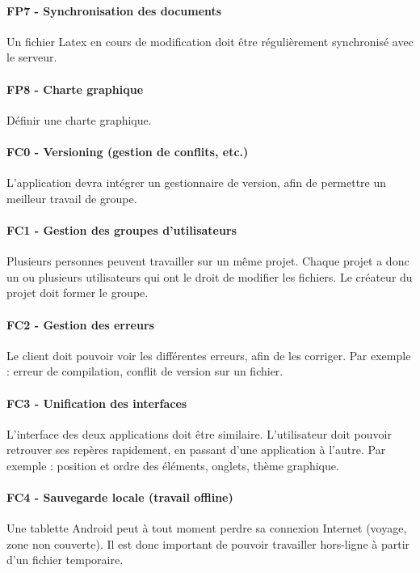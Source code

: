 \documentclass[a4paper,12pt]{article}
\begin{document}
\paragraph{FP7 - Synchronisation des documents\\}
Un fichier Latex en cours de modification doit être régulièrement synchronisé avec le serveur.

\paragraph{FP8 - Charte graphique\\}
Définir une charte graphique.


\paragraph{FC0 - Versioning (gestion de conflits, etc.)\\}
L'application devra intégrer un gestionnaire de version, afin de permettre un meilleur travail de
groupe.

\paragraph{FC1 - Gestion des groupes d'utilisateurs\\}
Plusieurs personnes peuvent travailler sur un même projet. Chaque projet a donc un ou plusieurs 
utilisateurs qui ont le droit de modifier les fichiers. Le créateur du projet doit former le groupe.

\paragraph{FC2 - Gestion des erreurs\\}
Le client doit pouvoir voir les différentes erreurs, afin de les corriger. Par exemple : erreur 
de compilation, conflit de version sur un fichier.

\paragraph{FC3 - Unification des interfaces\\}
L'interface des deux applications doit être similaire. L'utilisateur doit pouvoir retrouver ses
repères rapidement, en passant d'une application à l'autre. Par exemple : position et ordre des 
éléments, onglets, thème graphique.

\paragraph{FC4 - Sauvegarde locale (travail offline)\\}
Une tablette Android peut à tout moment perdre sa connexion Internet (voyage, zone non couverte). 
Il est donc important de pouvoir travailler hors-ligne à partir d'un fichier temporaire.
\end{document}
